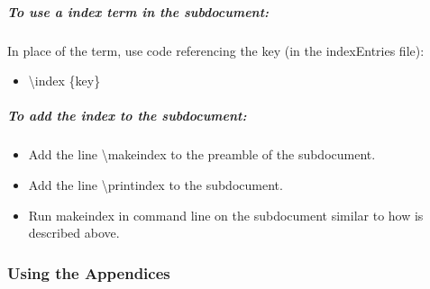 \subparagraph[Using an index term]{To use a index term in the subdocument:\texorpdfstring{\\}{}}
In place of the term, use code referencing the key (in the indexEntries file):

\begin{itemize}
\item \textbackslash index \{key\}
\end{itemize}

\subparagraph{To add the index to the subdocument:}
\begin{itemize}
\item Add the line \textbackslash makeindex to the preamble of the subdocument.
\item Add the line \textbackslash printindex to the subdocument.
\item Run makeindex in command line on the subdocument similar to how is described above.

\end{itemize}


\subsubsection[Using the Appendices]{{\Large Using the Appendices}}


